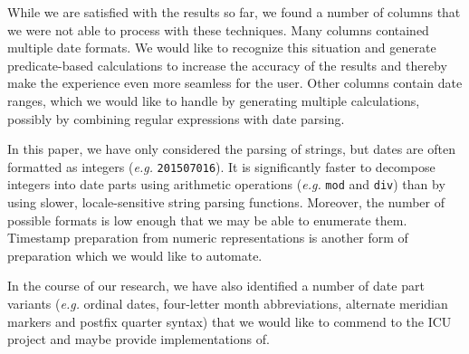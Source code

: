 While we are satisfied with the results so far, we found a number of columns that we were not able to process with these techniques. Many columns contained multiple date formats. We would like to recognize this situation and generate predicate-based calculations to increase the accuracy of the results and thereby make the experience even more seamless for the user. Other columns contain date ranges, which we would like to handle by generating multiple calculations, possibly by combining regular expressions with date parsing.

In this paper, we have only considered the parsing of strings, but dates are often formatted as integers (\textit{e.g.} \texttt{201507016}). It is significantly faster to decompose integers into date parts using arithmetic operations (\textit{e.g.} \texttt{mod} and \texttt{div}) than by using slower, locale-sensitive string parsing functions. Moreover, the number of possible formats is low enough that we may be able to enumerate them. Timestamp preparation from numeric representations is another form of preparation which we would like to automate.

In the course of our research, we have also identified a number of date part variants (\textit{e.g.} ordinal dates, four-letter month abbreviations, alternate meridian markers and postfix quarter syntax) that we would like to commend to the ICU project and maybe provide implementations of.
